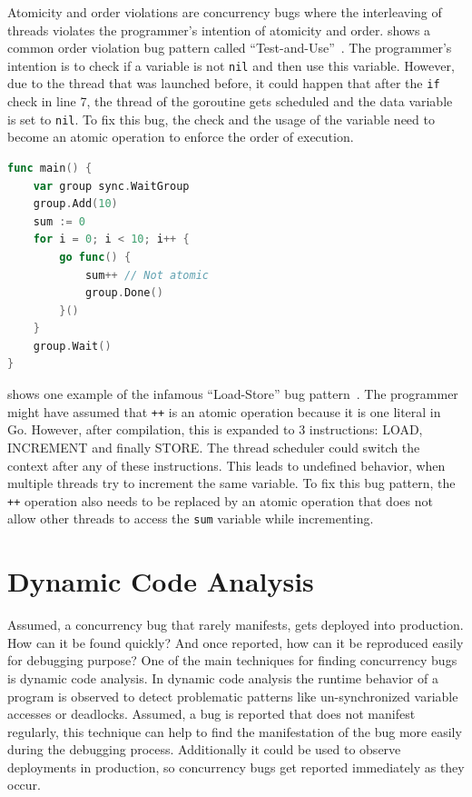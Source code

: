 \documentclass[conference]{IEEEtran}
\begin{document}
Atomicity and order violations are concurrency bugs where the interleaving of threads violates the programmer's intention of atomicity and order.
 shows a common order violation bug pattern called ``Test-and-Use''~\cite{farchi2003patterns}.
The programmer's intention is to check if a variable is not \lstinline{nil} and then use this variable.
However, due to the thread that was launched before, it could happen that after the \lstinline{if} check in line 7, the thread of the goroutine gets scheduled and the data variable is set to \lstinline{nil}.
To fix this bug, the check and the usage of the variable need to become an atomic operation to enforce the order of execution.

\begin{lstlisting}[float=h, language=Go, label=lst:atomicity, caption=Load-Store bug pattern -- Atomicity violation]
func main() {
    var group sync.WaitGroup
    group.Add(10)
    sum := 0
    for i = 0; i < 10; i++ {
        go func() {
            sum++ // Not atomic
            group.Done()
        }()
    }
    group.Wait()
}
\end{lstlisting}

 shows one example of the infamous ``Load-Store'' bug pattern~\cite{farchi2003patterns}.
The programmer might have assumed that \lstinline{++} is an atomic operation because it is one literal in Go.
However, after compilation, this is expanded to 3 instructions: LOAD, INCREMENT and finally STORE.
The thread scheduler could switch the context after any of these instructions.
This leads to undefined behavior, when multiple threads try to increment the same variable.
To fix this bug pattern, the \lstinline{++} operation also needs to be replaced by an atomic operation that does not allow other threads to access the \lstinline{sum} variable while incrementing.


\section{Dynamic Code Analysis}
\label{sct:dynamic}

Assumed, a concurrency bug that rarely manifests, gets deployed into production.
How can it be found quickly?
And once reported, how can it be reproduced easily for debugging purpose?
One of the main techniques for finding concurrency bugs is dynamic code analysis.
In dynamic code analysis the runtime behavior of a program is observed to detect problematic patterns like un-synchronized variable accesses or deadlocks.
Assumed, a bug is reported that does not manifest regularly, this technique can help to find the manifestation of the bug more easily during the debugging process.
Additionally it could be used to observe deployments in production, so concurrency bugs get reported immediately as they occur.
\end{document}
